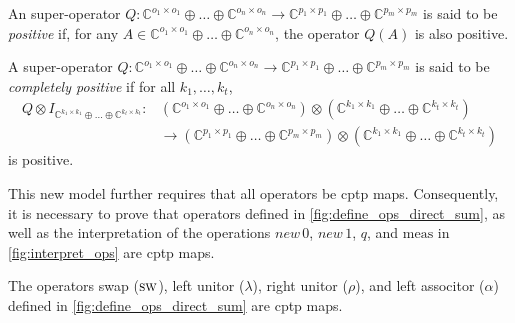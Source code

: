   \begin{definition}\label{def:positive_superop_direct_sum}
    An super-operator $Q: \mathbb{C}^{o_1 \times o_1} \oplus \ldots \oplus \mathbb{C}^{o_n \times o_n} \rightarrow \mathbb{C}^{p_1 \times p_1} \oplus \ldots \oplus \mathbb{C}^{p_m \times p_m}$ is said to be \emph{positive} if, for any $A \in \mathbb{C}^{o_1 \times o_1} \oplus \ldots \oplus \mathbb{C}^{o_n \times o_n}$, the operator $Q(A)$ is also positive.
  \end{definition}

  \begin{definition} \label{def:cp_direct_sum}
    A super-operator $Q: \mathbb{C}^{o_1 \times o_1} \oplus \ldots \oplus \mathbb{C}^{o_n \times o_n} \rightarrow \mathbb{C}^{p_1 \times p_1} \oplus \ldots \oplus \mathbb{C}^{p_m \times p_m} $ is said to be \emph{completely positive} if for all $k_1, \ldots, k_t$,
  \begin{equation*}
    \begin{split}
      Q \otimes I_{\mathbb{C}^{k_1 \times k_1} \oplus \ldots \oplus \mathbb{C}^{k_t \times k_t} }: & (\mathbb{C}^{o_1 \times o_1} \oplus \ldots \oplus \mathbb{C}^{o_n \times o_n}) \otimes (\mathbb{C}^{k_1 \times k_1} \oplus \ldots \oplus \mathbb{C}^{k_t \times k_t}) \\
      & \rightarrow (\mathbb{C}^{p_1 \times p_1} \oplus \ldots \oplus \mathbb{C}^{p_m \times p_m}) \otimes (\mathbb{C}^{k_1 \times k_1} \oplus \ldots \oplus \mathbb{C}^{k_t \times k_t})  
    \end{split}
  \end{equation*}
is positive.
\end{definition}

 This new model further requires that all operators be \acrshort{cptp} maps. 
 Consequently, it is necessary to prove that  operators defined in \autoref{fig:define_ops_direct_sum}, as well as the interpretation of the operations $\textit{new} \, 0$, $\textit{new} \, 1$, $q$, and $\text{meas}$ in  \autoref{fig:interpret_ops} are \acrshort{cptp} maps.

\begin{proposition}
  The operators swap ($\textsc{sw}$), left unitor ($\lambda$), right unitor ($\rho$), and left associtor ($\alpha$) defined in \autoref{fig:define_ops_direct_sum} are \acrshort{cptp} maps.
\end{proposition}

